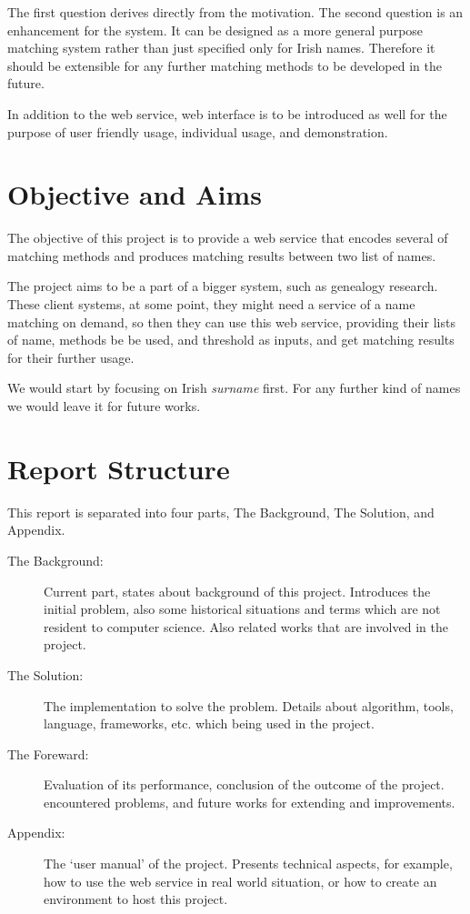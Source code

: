 The first question derives directly from the motivation.
The second question is an enhancement for the system. It can be designed
as a more general purpose matching system rather than just specified
only for Irish names. Therefore it should be extensible for any further
matching methods to be developed in the future.

In addition to the web service, web interface is to be introduced as well
for the purpose of user friendly usage, individual usage, and demonstration.

\section{Objective and Aims}

The objective of this project is to provide a web service that
encodes several of matching methods and produces matching
results between two list of names.

The project aims to be a part of a bigger system, such as
genealogy research. These client systems, at some point,
they might need a service of a name matching on demand, so then they can use this
web service, providing their lists of name, methods be be used,
and threshold as inputs, and get matching results for their further usage.

We would start by focusing on Irish \textit{surname} first.
For any further kind of names we would leave it for future works.

\section{Report Structure}

This report is separated into four parts, The Background, The Solution,
and Appendix.

\begin{description}
\item[The Background:]
  Current part, states about background of this project. Introduces
  the initial problem, also some historical situations and terms
  which are not resident to computer science. Also related works
  that are involved in the project.
\item[The Solution:]
  The implementation to solve the problem. Details about algorithm,
  tools, language, frameworks, etc. which being used in the project.
\item[The Foreward:]
  Evaluation of its performance, conclusion of the outcome of the project. 
  encountered problems, and future works for extending and improvements.
\item[Appendix:]
  The `user manual' of the project. Presents technical aspects,
  for example, how to use the web service in real world situation,
  or how to create an environment to host this project.
\end{description}
